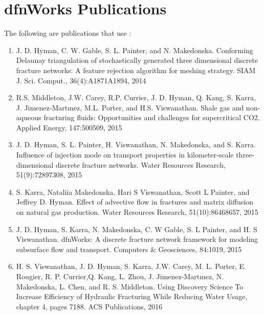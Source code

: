 \documentclass[letterpaper,10pt,english]{sphinxmanual}
\begin{document}
\chapter{dfnWorks Publications}
\label{\detokenize{publications:dfnworks-publications}}\label{\detokenize{publications:publications-chapter}}\label{\detokenize{publications::doc}}
The following are publications that use :
\begin{enumerate}
\def\theenumi{\arabic{enumi}}
\def\labelenumi{\theenumi .}
\makeatletter\def\p@enumii{\p@enumi \theenumi .}\makeatother
\item {} 
J. D. Hyman, C. W. Gable, S. L. Painter, and N. Makedonska. Conforming Delaunay triangulation of stochastically generated three dimensional discrete fracture networks: A feature rejection algorithm for meshing strategy. SIAM J. Sci. Comput., 36(4):A1871\textendash{}A1894, 2014

\item {} 
R.S. Middleton, J.W. Carey, R.P. Currier, J. D. Hyman, Q. Kang, S. Karra, J. Jimenez-Martınez, M.L. Porter, and H.S. Viswanathan. Shale gas and non-aqueous fracturing fluids: Opportunities and challenges for supercritical CO2. Applied Energy, 147:500\textendash{}509, 2015

\item {} 
J. D. Hyman, S. L. Painter, H. Viswanathan, N. Makedonska, and S. Karra. Influence of injection mode on transport properties in kilometer-scale three-dimensional discrete fracture networks. Water Resources Research, 51(9):7289\textendash{}7308, 2015

\item {} 
S. Karra, Nataliia Makedonska, Hari S Viswanathan, Scott L Painter, and Jeffrey D. Hyman. Effect of advective flow in fractures and matrix diffusion on natural gas production. Water Resources Research, 51(10):8646\textendash{}8657, 2015

\item {} 
J. D. Hyman, S. Karra, N. Makedonska, C. W Gable, S. L Painter, and H. S Viswanathan. dfnWorks: A discrete fracture network framework for modeling subsurface flow and transport. Computers \& Geosciences, 84:10\textendash{}19, 2015

\item {} 
H. S. Viswanathan, J. D. Hyman, S. Karra, J.W. Carey, M. L. Porter, E. Rougier, R. P. Currier,Q. Kang, L. Zhou, J. Jimenez-Martınez, N. Makedonska, L. Chen, and R. S. Middleton. Using Discovery Science To Increase Efficiency of Hydraulic Fracturing While Reducing Water Usage, chapter 4, pages 71\textendash{}88. ACS Publications, 2016


\end{enumerate}
\end{document}

